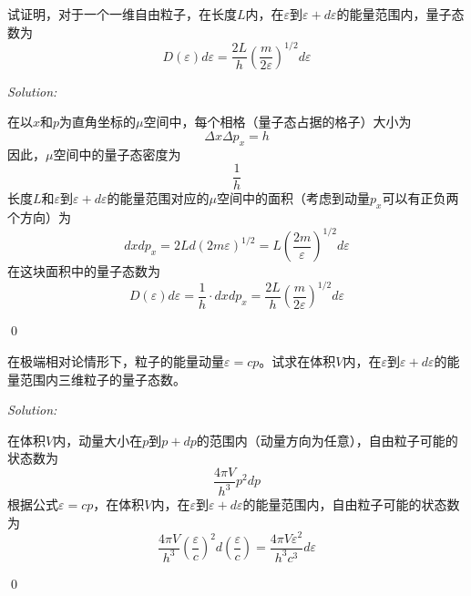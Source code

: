 \documentclass[12pt,a4paper]{article}
\newenvironment{problem}[2][Problem]{\begin{trivlist}
\item[\hskip \labelsep {\bfseries #1}\hskip \labelsep {\bfseries #2.}]}{\end{trivlist}}
\newenvironment{sol}
    {\emph{Solution:}
    }
    {
    \qed
    }
\begin{document}
\begin{problem}{6.2}
试证明，对于一个一维自由粒子，在长度$L$内，在$\varepsilon$到$\varepsilon+d\varepsilon$的能量范围内，量子态数为
\[
D(\varepsilon)d\varepsilon=\frac{2L}{h}\left(\frac{m}{2\varepsilon}\right)^{1/2}d\varepsilon
\]
\end{problem}
\begin{sol}
在以$x$和$p$为直角坐标的$\mu$空间中，每个相格（量子态占据的格子）大小为
\begin{equation}
\Delta x\Delta p_x=h
\end{equation}
因此，$\mu$空间中的量子态密度为
\begin{equation}
\frac{1}{h}
\end{equation}
长度$L$和$\varepsilon$到$\varepsilon+d\varepsilon$的能量范围对应的$\mu$空间中的面积（考虑到动量$p_x$可以有正负两个方向）为
\begin{equation}
dxdp_x=2Ld(2m\varepsilon)^{1/2}=L\left(\frac{2m}{\varepsilon}\right)^{1/2}d\varepsilon
\end{equation}
在这块面积中的量子态数为
\begin{equation}
D(\varepsilon)d\varepsilon=\frac{1}{h}\cdot dxdp_x=\frac{2L}{h}\left(\frac{m}{2\varepsilon}\right)^{1/2}d\varepsilon
\end{equation}
\end{sol}

\begin{problem}{6.4}
在极端相对论情形下，粒子的能量动量$\varepsilon=cp$。试求在体积$V$内，在$\varepsilon$到$\varepsilon+d\varepsilon$的能量范围内三维粒子的量子态数。
\end{problem}
\begin{sol}
在体积$V$内，动量大小在$p$到$p+dp$的范围内（动量方向为任意），自由粒子可能的状态数为
\begin{equation}
\frac{4\pi V}{h^3}p^2dp
\end{equation}
根据公式$\varepsilon=cp$，在体积$V$内，在$\varepsilon$到$\varepsilon+d\varepsilon$的能量范围内，自由粒子可能的状态数为
\begin{equation}
\frac{4\pi V}{h^3}\left(\frac{\varepsilon}{c}\right)^2d\left(\frac{\varepsilon}{c}\right)=\frac{4\pi V\varepsilon^2}{h^3c^3}d\varepsilon
\end{equation}
\end{sol}
\end{document}
